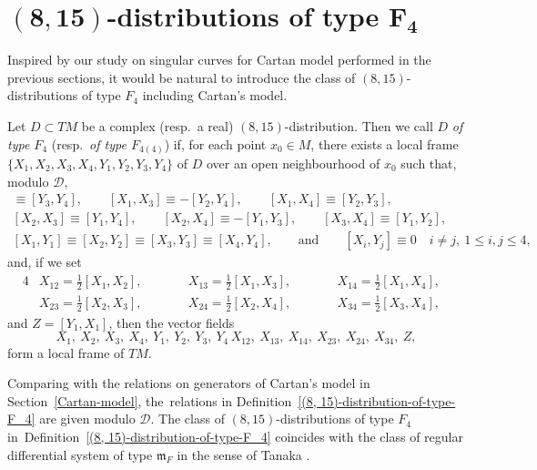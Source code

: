 \section[(8,15)-distributions of type F\_4]{$\boldsymbol{(8,15)}$-distributions of type $\boldsymbol{F_4}$}
\label{$(8, 15)$-distributions of type $F_4$}

Inspired by our study on singular curves for Cartan model performed in the previous sections,
it would be natural to introduce the class of $(8, 15)$-distributions of type $F_4$ including Cartan's model.

\begin{Definition}
\label{(8, 15)-distribution-of-type-F_4}
Let $D \subset TM$ be a complex (resp.\ a real) $(8, 15)$-distribution.
Then we call $D$ {\it of type $F_4$} (resp.\ {\it of type $F_{4(4)}$})
if, for each point $x_0 \in M$, there exists a local frame $\{ X_1, X_2, X_3, X_4,
Y_1, Y_2, Y_3, Y_4\}$ of $D$ over an open neighbourhood of $x_0$ such that, modulo ${\mathcal D}$,
\begin{gather*}
[X_1, X_2] \equiv [Y_3, Y_4], \qquad [X_1, X_3] \equiv -[Y_2, Y_4], \qquad [X_1, X_4] \equiv [Y_2, Y_3],
\\
[X_2, X_3] \equiv [Y_1, Y_4], \qquad [X_2, X_4] \equiv -[Y_1, Y_3], \qquad [X_3, X_4] \equiv [Y_1, Y_2],
\\
[X_1, Y_1] \equiv [X_2, Y_2] \equiv [X_3, Y_3] \equiv [X_4, Y_4],
\qquad {\text{and}} \qquad [X_i, Y_j] \equiv 0 \quad i \not= j, \ 1 \leq i, j \leq 4,
\end{gather*}
and, if we set
\begin{alignat*}{4}
&X_{12} = \frac{1}{2}[X_1, X_2],\qquad&& X_{13} = \frac{1}{2}[X_1, X_3],\qquad&& X_{14} = \frac{1}{2}[X_1, X_4],&\\
&X_{23} = \frac{1}{2}[X_2, X_3],\qquad&& X_{24} = \frac{1}{2}[X_2, X_4],\qquad&& X_{34} = \frac{1}{2}[X_3, X_4],&
\end{alignat*}
and $Z = [Y_1, X_1]$,
then the vector fields
\[
X_1,\ X_2,\ X_3,\ X_4,\ Y_1,\ Y_2,\ Y_3,\ Y_4\, X_{12},\ X_{13},\ X_{14},\ X_{23},\ X_{24},\ X_{34},\ Z,
\]
form a local frame of $TM$.
\end{Definition}

\begin{Remark}
Comparing with the relations on generators of Cartan's model in Section~\ref{Cartan-model},
the~relations in Definition~\ref{(8, 15)-distribution-of-type-F_4} are given modulo ${\mathcal D}$.
The class of $(8, 15)$-distributions of type $F_4$ in~Definition~\ref{(8, 15)-distribution-of-type-F_4}
coincides with the class of regular differential system of type ${\mathfrak m}_F$ in the sense of
Tanaka \cite{Tanaka1, Tanaka2, Yamaguchi}.
\end{Remark}


